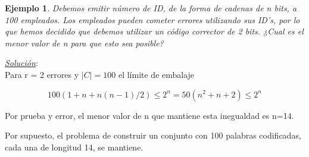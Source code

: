 \documentclass{beamer}
\theoremstyle{plain}
\theoremstyle{example}
\theoremstyle{example}
\newtheorem{ejemplo} [Ejemplo] {Ejemplo}
\begin{document}
\begin{frame}  \small  
\begin{ejemplo}
Debemos emitir número de ID, de la forma de cadenas de n bits, a 100 empleados. Los empleados pueden cometer errores utilizando sus ID's, por lo que hemos decidido que debemos utilizar un código corrector de 2 bits. ¿Cual es el menor valor de n para que esto sea posible?
\end{ejemplo}


\textit{\underline{Solución}}:\\
\vspace{0.3cm}
Para r = 2 errores y $|C| = 100$ el límite de embalaje 

\[
  100 \left( 1+n+  n (n-1) /2 \right)   \leq 2^n   =  50(n^2 +n+2) \leq 2^n 		
\]
\vspace{0.3cm}

Por prueba y error, el menor valor de n que mantiene esta inegualdad es n=14. 
\vspace{0.3cm}

Por supuesto, el problema de construir un  conjunto con 100 palabras codificadas, cada una de longitud 14, se mantiene.


\end{frame} 
\end{document}

